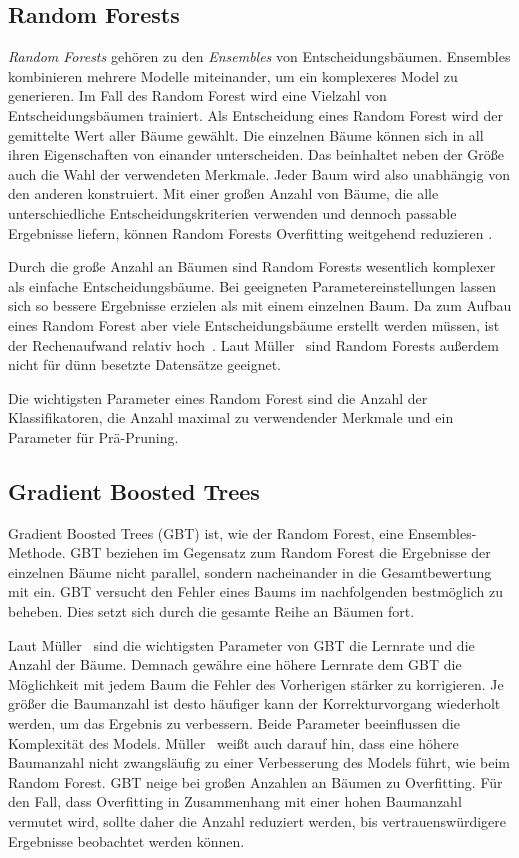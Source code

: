 \subsection{Random Forests}
\label{sec:random_forest}
\textit{Random Forests} gehören zu den \textit{Ensembles} von Entscheidungsbäumen. Ensembles kombinieren mehrere Modelle miteinander, um ein komplexeres Model zu generieren. Im Fall des Random Forest wird eine Vielzahl von Entscheidungsbäumen trainiert. Als Entscheidung eines Random Forest wird der gemittelte Wert aller Bäume gewählt. Die einzelnen Bäume können sich in all ihren Eigenschaften von einander unterscheiden. Das beinhaltet neben der Größe auch die Wahl der verwendeten Merkmale. Jeder Baum wird also unabhängig von den anderen konstruiert. Mit einer großen Anzahl von Bäume, die alle unterschiedliche Entscheidungskriterien verwenden und dennoch passable Ergebnisse liefern, können Random Forests Overfitting weitgehend reduzieren \cite{Muller.2017}.

Durch die große Anzahl an Bäumen sind Random Forests wesentlich komplexer als einfache Entscheidungsbäume. Bei geeigneten Parametereinstellungen lassen sich so bessere Ergebnisse erzielen als mit einem einzelnen Baum. Da zum Aufbau eines Random Forest aber viele Entscheidungsbäume erstellt werden müssen, ist der Rechenaufwand relativ hoch~\cite[S.~84]{Muller.2017}. Laut Müller~\cite[S.~85]{Muller.2017} sind Random Forests außerdem nicht für dünn besetzte Datensätze geeignet.

Die wichtigsten Parameter eines Random Forest sind die Anzahl der Klassifikatoren, die Anzahl maximal zu verwendender Merkmale und ein Parameter für Prä-Pruning.~\cite[S.~85]{Muller.2017}
\subsection{Gradient Boosted Trees}
\label{sec:gradient_boosted_trees}
Gradient Boosted Trees (GBT) ist, wie der Random Forest, eine Ensembles-Methode. GBT beziehen im Gegensatz zum Random Forest die Ergebnisse der einzelnen Bäume nicht parallel, sondern nacheinander in die Gesamtbewertung mit ein. GBT versucht den Fehler eines Baums im nachfolgenden bestmöglich zu beheben. Dies setzt sich durch die gesamte Reihe an Bäumen fort.

Laut Müller~\cite{Muller.2017} sind die wichtigsten Parameter von GBT die Lernrate und die Anzahl der Bäume. Demnach gewähre eine höhere Lernrate dem GBT die Möglichkeit mit jedem Baum die Fehler des Vorherigen stärker zu korrigieren. Je größer die Baumanzahl ist desto häufiger kann der Korrekturvorgang wiederholt werden, um das Ergebnis zu verbessern. Beide Parameter beeinflussen die Komplexität des Models. Müller~\cite{Muller.2017} weißt auch darauf hin, dass eine höhere Baumanzahl nicht zwangsläufig zu einer Verbesserung des Models führt, wie beim Random Forest. GBT neige bei großen Anzahlen an Bäumen zu Overfitting. Für den Fall, dass Overfitting in Zusammenhang mit einer hohen Baumanzahl vermutet wird, sollte daher die Anzahl reduziert werden, bis vertrauenswürdigere Ergebnisse beobachtet werden können.

